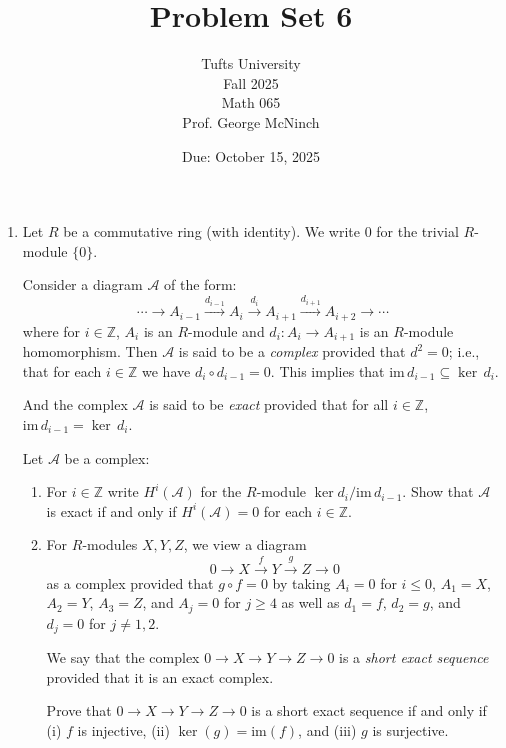 \documentclass{article}
\title{Problem Set 6}
\author{Tufts University \\ Fall 2025 \\ Math 065 \\ Prof. George McNinch}
\date{Due: October 15, 2025}
\begin{document}
\maketitle


\begin{enumerate}

\item
Let $ R $ be a commutative ring (with identity). We write $ 0 $ for the trivial $ R $-module $ \{0\} $.

Consider a diagram $ \mathcal{A} $ of the form:
$$\cdots \rightarrow A_{i-1} \xrightarrow{d_{i-1}} A_i \xrightarrow{d_i} A_{i+1} \xrightarrow{d_{i+1}} A_{i+2} \rightarrow \cdots$$
where for $ i \in \mathbb{Z} $, $ A_i $ is an $ R $-module and $ d_i: A_i \rightarrow A_{i+1} $ is an $ R $-module homomorphism. Then $ \mathcal{A} $ is said to be a \emph{complex} provided that $ d^2 = 0 $; i.e., that for each $ i \in \mathbb{Z} $ we have $ d_i \circ d_{i-1} = 0 $. This implies that $ \text{im} \, d_{i-1} \subseteq \ker \, d_i $.

And the complex $ \mathcal{A} $ is said to be \emph{exact} provided that for all $ i \in \mathbb{Z} $, $ \text{im} \, d_{i-1} = \ker \, d_i $.

Let $ \mathcal{A} $ be a complex:

\begin{enumerate}
    \item For $ i \in \mathbb{Z} $ write $ H^i(\mathcal{A}) $ for the $ R $-module $ \ker d_i / \text{im} \, d_{i-1} $. Show that $ \mathcal{A} $ is exact if and only if $ H^i(\mathcal{A}) = 0 $ for each $ i \in \mathbb{Z} $.

    \item For $ R $-modules $ X, Y, Z $, we view a diagram 
    $$0 \rightarrow X \xrightarrow{f} Y \xrightarrow{g} Z \rightarrow 0$$
    as a complex provided that $ g \circ f = 0 $ by taking $ A_i = 0 $ for $ i \leq 0 $, $ A_1 = X $, $ A_2 = Y $, $ A_3 = Z $, and $ A_j = 0 $ for $ j \geq 4 $ as well as $ d_1 = f $, $ d_2 = g $, and $ d_j = 0 $ for $ j \neq 1,2 $.

    We say that the complex $ 0 \rightarrow X \rightarrow Y \rightarrow Z \rightarrow 0 $ is a \emph{short exact sequence} provided that it is an exact complex. 
    
    Prove that $ 0 \rightarrow X \rightarrow Y \rightarrow Z \rightarrow 0 $ is a short exact sequence if and only if
    (i) $ f $ is injective, (ii) $ \ker(g) = \text{im}(f) $, and (iii) $ g $ is surjective.


\end{enumerate}
\end{enumerate}
\end{document}
